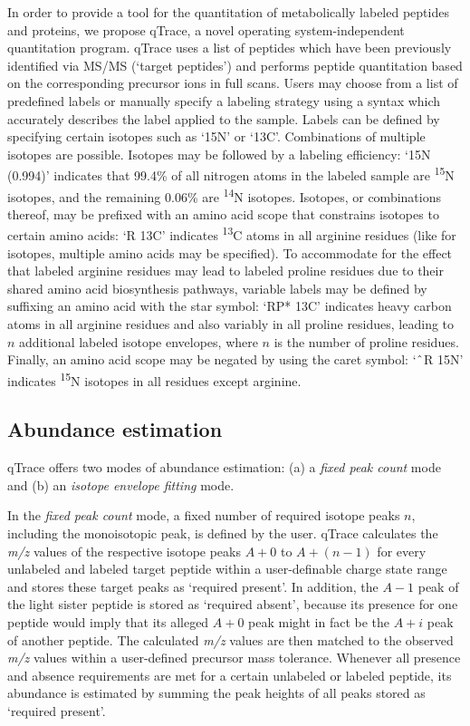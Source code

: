 In order to provide a tool for the quantitation of metabolically labeled 
peptides and proteins, we propose qTrace, a novel operating system-independent 
quantitation program. 
qTrace uses a list of peptides which have been previously identified via MS/MS
(`target peptides') and performs peptide quantitation based on the corresponding 
precursor ions in full scans.
Users may choose from a list of predefined labels or manually specify a 
labeling strategy using a syntax which accurately describes the label applied 
to the sample.
Labels can be defined by specifying certain isotopes such as `15N' or `13C'.
Combinations of multiple isotopes are possible. 
Isotopes may be followed by a labeling efficiency: `15N (0.994)'
indicates that 99.4\% of all nitrogen atoms in the labeled sample are 
\textsuperscript{15}N isotopes, and the remaining 0.06\% are 
\textsuperscript{14}N isotopes. 
Isotopes, or combinations thereof, may be prefixed with an 
amino acid scope that constrains isotopes to certain amino acids: 
`R 13C' indicates \textsuperscript{13}C atoms in all arginine residues (like for 
isotopes, multiple amino acids may be specified). 
To accommodate for the effect that labeled arginine residues may lead 
to labeled proline residues due to their shared amino acid biosynthesis pathways, 
variable labels may be defined by suffixing an amino acid with the star 
symbol: `RP* 13C' indicates heavy carbon atoms in all arginine residues 
and also variably in all proline residues, leading to $n$ additional labeled 
isotope envelopes, where $n$ is the number of proline residues.
Finally, an amino acid scope may be negated by using the caret symbol: 
`$\caret$R 15N' indicates \textsuperscript{15}N isotopes in all residues 
except arginine.

\subsection{Abundance estimation}

qTrace offers two modes of abundance estimation: (a) a {\em fixed peak count} 
mode and (b) an {\em isotope envelope fitting} mode. 

In the {\em fixed peak count} mode, a fixed number of required isotope peaks $n$,
including the monoisotopic peak, is defined by the user.
qTrace calculates the {\em m/z} values of the respective isotope peaks 
\mbox{$A+0$} to $A+(n-1)$ for every unlabeled and labeled target peptide within 
a user-definable charge state range and stores these target peaks as 
`required present'. 
In addition, the $A-1$ peak of the light sister peptide is stored as 
`required absent', because its presence for one peptide would imply 
that its alleged $A+0$ peak might in fact be the $A+i$ peak of 
another peptide. 
The calculated {\em m/z} values are then matched to the observed {\em m/z} 
values within a user-defined precursor mass tolerance.
Whenever all presence and absence requirements are met for a certain unlabeled 
or labeled peptide, its abundance is estimated by summing the peak heights of 
all peaks stored as `required present'. 

